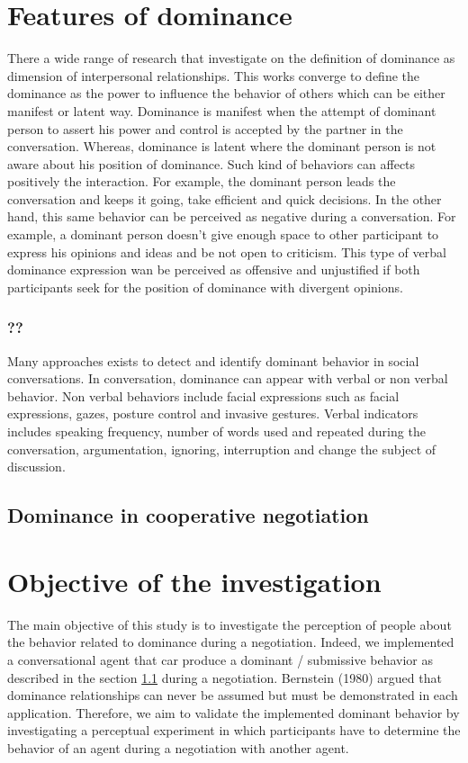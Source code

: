 \documentclass{llncs}
\begin{document}
\section{Features of dominance}
There a wide range of research that investigate on the definition of dominance as dimension of interpersonal relationships. This works converge to define the dominance as the power to influence the behavior of others which can be either manifest or latent way. Dominance is manifest when the attempt of dominant person to assert his power and control is accepted by the partner in the conversation. Whereas, dominance is latent where the dominant person is not aware about his position of dominance. Such kind of behaviors can affects positively the interaction. For example, the dominant person leads the conversation and keeps it going,  take efficient and quick decisions. In the other hand, this same behavior can be perceived as negative during a conversation. For example, a dominant person doesn't give enough space to other participant to express his opinions and ideas and be not open to criticism. This type of verbal dominance expression wan be perceived as offensive and unjustified if both participants seek for the position of dominance with divergent opinions. 

\subsubsection{??}
Many approaches exists to detect and identify dominant behavior in social conversations. In conversation, dominance can appear with verbal or non verbal behavior. Non verbal behaviors include facial expressions such as facial expressions, gazes, posture control and invasive gestures.  Verbal indicators includes speaking frequency, number of words used and repeated during the conversation, argumentation, ignoring, interruption and change the subject of discussion.     

\subsection{Dominance in cooperative negotiation}
\label{DN}

\section{Objective of the investigation}

The main objective of this study is to investigate the perception of people about the behavior related to dominance during a negotiation. Indeed, we implemented a conversational agent that car produce a dominant / submissive behavior as described in the section \ref{DN} during a negotiation. Bernstein (1980) argued that dominance relationships can never be assumed but must be demonstrated in each application. Therefore, we aim to validate the implemented dominant behavior by investigating a perceptual experiment in which participants have to determine the behavior of an agent during a negotiation with another agent. 
\end{document}
